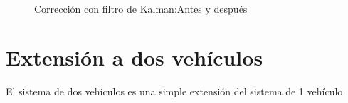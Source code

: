 \begin{figure}[!htb]
  \begin{center}
    \caption{Corrección con filtro de Kalman:Antes y después}
    \label{fig:CorrciónUnicar}
  \end{center}
\end{figure}
\newpage

\section{Extensión a dos vehículos}
El sistema de dos vehículos es una simple extensión del sistema de 1 vehículo

